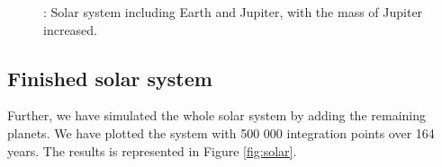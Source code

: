 \documentclass{article}
\begin{document}
        \begin{figure}[H]
            \caption{: Solar system including Earth and Jupiter, with the mass of Jupiter increased.}
            \label{fig:jupiter}
            \end{figure}

        \subsection{Finished solar system}
            Further, we have simulated the whole solar system by adding the remaining planets. We have plotted the system with 500 000 integration points over 164 years. The results is represented in Figure \ref{fig:solar}.
\end{document}
